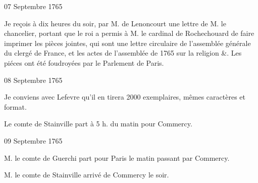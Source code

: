                      
                     \begin{diary}{07 Septembre 1765}{}
                        
                         Je reçois à dix heures du soir, par
                              M. de
                              Lenoncourt une lettre de M. le chancelier,
                           portant que le roi a
                           permis à M. le cardinal
                              de Rochechouard
                           de faire imprimer les pièces jointes, qui sont une
                           lettre circulaire de l'assemblée générale du
                           clergé de France, et les actes de
                              l'assemblée
                              de 1765 sur la religion &. Les piéces ont 
                           été foudroyées par le Parlement de Paris. \bigskip
        
        
                     \end{diary}

                     \begin{diary}{08 Septembre 1765}{}
                        
                         Je conviens avec Lefevre qu'il en tirera
                           2000 exemplaires, mêmes caractères et format. \bigskip
        
        
                        
                           Le comte de Stainville part à 5 h.
                           du matin
                           pour Commercy. \bigskip
        
        
                     \end{diary}

                     \begin{diary}{09 Septembre 1765}{}
                        
                        
                           M. le comte de Guerchi part pour
                              Paris le
                           matin passant par Commercy. \bigskip
        
        
                        
                           M. le comte de Stainville arrivé
                           de Commercy
                           le soir. \bigskip
        
        
                     \end{diary}

